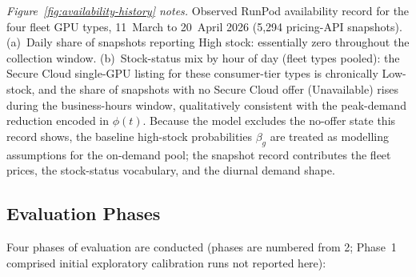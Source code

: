 {\noindent\textit{Figure~\ref{fig:availability-history} notes.} Observed RunPod availability record for the four fleet GPU types, 11~March to 20~April 2026 (5,294 pricing-API snapshots). (a)~Daily share of snapshots reporting High stock: essentially zero throughout the collection window. (b)~Stock-status mix by hour of day (fleet types pooled): the Secure Cloud single-GPU listing for these consumer-tier types is chronically Low-stock, and the share of snapshots with no Secure Cloud offer (Unavailable) rises during the business-hours window, qualitatively consistent with the peak-demand reduction encoded in $\phi(t)$. Because the model excludes the no-offer state this record shows, the baseline high-stock probabilities $\beta_g$ are treated as modelling assumptions for the on-demand pool; the snapshot record contributes the fleet prices, the stock-status vocabulary, and the diurnal demand shape.\par

\subsection{Evaluation Phases}
\label{ssec:evaluation-phases}

Four phases of evaluation are conducted (phases are numbered from 2; Phase~1 comprised initial exploratory calibration runs not reported here):

}
